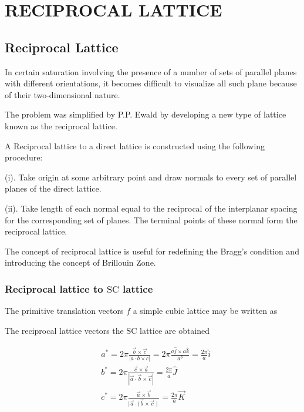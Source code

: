 \chapter{RECIPROCAL LATTICE}


\section{Reciprocal Lattice}

In certain saturation involving the presence of a number of sets of parallel planes with different orientations, it becomes difficult to visualize all such plane because of their two-dimensional nature.

The problem was simplified by P.P. Ewald by developing a new type of lattice known as the reciprocal lattice.

A Reciprocal lattice to a direct lattice is constructed using the following procedure:

(i). Take origin at some arbitrary point and draw normals to every set of parallel planes of the direct lattice.

(ii). Take length of each normal equal to the reciprocal of the interplanar spacing for the corresponding set of planes. The terminal points of these normal form the reciprocal lattice.

The concept of reciprocal lattice is useful for redefining the Bragg's condition and introducing the concept of Brillouin Zone.

\subsection{Reciprocal lattice to $\mathrm{SC}$ lattice}

The primitive translation vectors $f$ a simple cubic lattice may be written as

The reciprocal lattice vectors the $\mathrm{SC}$ lattice are obtained

$$
\begin{aligned}
&a^{*}=2 \pi \frac{\vec{b} \times \vec{c}}{|a \cdot b \times c|}=2 \pi \frac{a \hat{j} \times a \hat{k}}{a^{3}}=\frac{2 \pi}{a} \hat{i} \\
&b^{*}=2 \pi \frac{\vec{c} \times \vec{a}}{|\vec{a} \cdot \vec{b} \times \vec{c}|}=\frac{2 \pi}{a} \hat{J} \\
&c^{*}=2 \pi \frac{\vec{a} \times \vec{b}}{\mid \vec{a} \cdot(\vec{b} \times \vec{c} \mid}=\frac{2 \pi}{a} \vec{K}
\end{aligned}
$$

